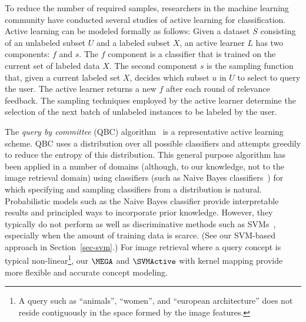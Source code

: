 To reduce the number of required samples, researchers
in the machine learning community have conducted 
several studies of active learning \cite{Cohn+al:1996,CFH97}
for classification.  Active learning can be modeled formally 
as follows: Given a dataset $S$ consisting of 
an unlabeled subset $U$ and a labeled subset $X$, an active
learner $L$ has two components: $f$ and $s$. The $f$ component
is a classifier that is trained on the current set of
labeled data $X$. The second component $s$ is the sampling
function that, given a current labeled set $X$, decides which
subset $u$ in $U$ to select to query the user.
The active learner returns a new $f$ after each round
of relevance feedback.  The sampling techniques
employed by the active learner determine the selection of 
the next batch of unlabeled instances to be labeled by the user.

The {\em query by committee} (QBC)
algorithm~\cite{Freund+al:ML97,Seung+al:COLT92} is
a representative active learning scheme.  QBC uses a distribution
over all possible classifiers and attempts greedily to reduce the
entropy of this distribution. This general purpose algorithm has been
applied in a number of domains (although, to our knowledge,
not to the image retrieval domain) using classifiers (such as Naive
Bayes classifiers~\cite{Dagan+Engelson:ICML95,McCallum+Nigam:ICML98})
for which specifying and sampling classifiers from a distribution is
natural.  Probabilistic models such as the Naive Bayes classifier
provide interpretable results and principled ways to incorporate prior
knowledge. However, they typically do not
perform as well as discriminative methods such as
SVMs~\cite{Joachims:ECML97,Dumais+al:CIKM98}, especially when
the amount of training data is scarce.
(See our SVM-based approach in Section~\ref{sec-svm}.)
For image retrieval where a query concept is typical non-linear\footnote{
A query such as ``animals'', ``women'', and 
``european architecture'' does not reside contiguously in the
space formed by the image features.}, our $\MEGA$ 
and $\SVMActive$ with kernel mapping
provide more flexible and accurate concept modeling.



